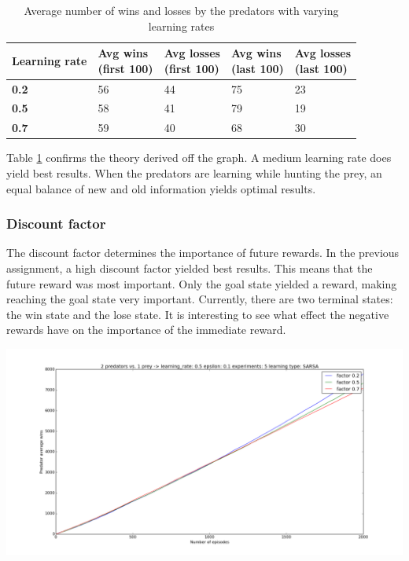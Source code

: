 \begin{table}[H]
\begin{center}
\begin{tabular}{| l | l | l | l | l |}
\hline
\parbox{2cm}{\textbf{Learning rate}} & \parbox{2cm}{\textbf{Avg wins \\ (first 100)}} & \parbox{2cm}{\textbf{Avg losses \\ (first 100)}} & \parbox{2cm}{\textbf{Avg wins \\ (last 100)}} & \parbox{2cm}{\textbf{Avg losses \\ (last 100)}} \\
\hline
\textbf{0.2} & 56 & 44 & 75 & 23 \\
\hline
\textbf{0.5} & 58 & 41 & 79 & 19 \\
\hline
\textbf{0.7} & 59 & 40 & 68 & 30 \\
\hline
\end{tabular}
\caption{Average number of wins and losses by the predators with varying learning rates}
\label{table:sarsalearningrates}
\end{center}
\end{table}

Table \ref{table:sarsalearningrates} confirms the theory derived off the graph. A medium learning rate does yield best results. When the predators are learning while hunting the prey, an equal balance of new and old information yields optimal results.

\subsubsection{Discount factor}
The discount factor determines the importance of future rewards. In the previous assignment, a high discount factor yielded best results. This means that the future reward was most important. Only the goal state yielded a reward, making reaching the goal state very important. Currently, there are two terminal states: the win state and the lose state. It is interesting to see what effect the negative rewards have on the importance of the immediate reward.

\begin{center}
	\includegraphics[scale=0.3]{2_predators_discount_factor_SARSA}
\end{center}

